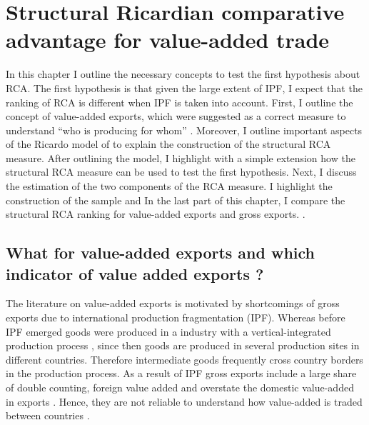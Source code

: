 \chapter{Structural Ricardian comparative advantage for value-added trade}
\label{cha:empirical}
In this chapter I outline the necessary concepts to test the first hypothesis about RCA.
The first hypothesis is that given the large extent of IPF, I expect that the ranking of RCA is different when IPF is taken into account.
First, I outline the concept of value-added exports, which were suggested as a correct measure to understand ``who is producing for whom'' \textcite{daudin2011}.
 Moreover, I outline important aspects of the Ricardo model of \textcite{costinot} to explain the construction of the structural RCA measure.
 After outlining the model, I highlight with a simple extension how the structural RCA measure can be used to test the first hypothesis.
Next, I discuss the estimation of the two components of the RCA measure.
I highlight the construction of the sample and
In the last part of this chapter, I compare the structural RCA ranking for value-added exports and gross exports.
. %
\section{What for value-added exports and which indicator of value added exports ?} \label{sec:vax}
%
The literature on value-added exports is motivated by shortcomings of gross exports due to international production fragmentation (IPF).
Whereas before IPF emerged  goods were produced in a industry with a vertical-integrated production process \textcite{Feenstra}, since then
goods are produced in several production sites in different countries.
Therefore intermediate goods  frequently cross country borders in the production process.
 As a result of IPF gross exports include a large share of double counting, foreign value added and overstate the domestic value-added in exports \textcite{johson}.
Hence, they are not reliable to understand how value-added is traded between countries \parencite{johnson}. \par

